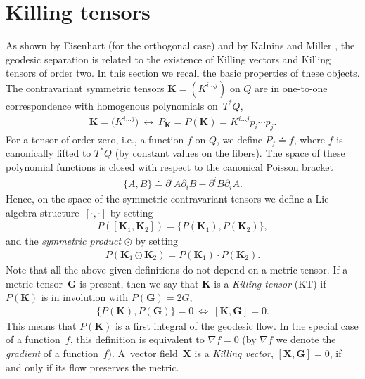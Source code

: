 \documentclass[pdftex]{sigma}
\def\bs{\boldsymbol}
\numberwithin{equation}{section}
\begin{document}
\section{Killing tensors}\label{section2}

As shown by Eisenhart \cite{Eisenhart-1934,Eisenhart-1949} (for the orthogonal case) and by Kalnins and Miller \cite{KM-1980,KM-1981}, the geodesic separation is related to the existence of Killing vectors and Killing tensors of order two. In this section we recall the basic properties of these objects.
The contravariant symmetric tensors $\bs K=(K^{i\ldots j})$ on $Q$ are in one-to-one correspondence with homogenous polynomials on~$T^*Q$,
\begin{gather*}
{\bs K}=\big(K^{i\ldots j}\big)\ \longleftrightarrow \  P_{{\bs K}}=P(\bs K)=K^{i\ldots j} p_i\cdots p_j.
\end{gather*}
For a tensor of order zero, i.e., a function $f$ on $Q$, we def\/ine $P_f\doteq f$, where $f$ is canonically lifted to $T^*Q$ (by constant values on the f\/ibers). The space of these polynomial functions is closed with respect to  the canonical Poisson bracket
\begin{gather*}
\{A,B\}\doteq \partial^iA \partial_iB-\partial^iB \partial_iA.
\end{gather*}
Hence, on the space of the symmetric contravariant tensors we def\/ine a Lie-algebra structu\-re~$[\cdot,\cdot]$ by setting
\begin{gather*}
P([{\bs K}_1,{\bs K}_2])=\{P({\bs K}_1),P({\bs K}_2)\},
\end{gather*}
and the {\it symmetric product} $\odot$ by setting
\begin{gather*}
P({\bs K}_1\odot{\bs K}_2)=P({\bs K}_1)\cdot P({\bs K}_2).
\end{gather*}
Note that all the above-given def\/initions do not depend on a metric tensor.
If a metric tensor~$\bs G$ is present, then we say that $\bs K$ is a {\it Killing tensor} (KT) if $P(\bs K)$ is in involution with $P(\bs G)=2G$,
\begin{gather}
\{P(\bs K),P(\bs G)\}=0\ \Longleftrightarrow\  [\bs K,\bs G]=0.
\label{(2.1)}
\end{gather}
This means that $P(\bs K)$ is a f\/irst integral of the geodesic f\/low.
In the special case of a function~$f$, this def\/inition is equivalent to $\nabla f=0$ (by $\nabla f$ we denote the {\it gradient} of a function~$f$). A~vector f\/ield~$\bs X$ is a {\it Killing vector}, $[\bs X,\bs G]=0$, if and only if its f\/low preserves the metric.
\end{document}
